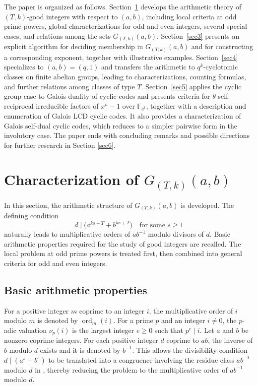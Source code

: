 \documentclass[pdflatex,sn-mathphys-num]{sn-jnl}%
\theoremstyle{thmstyleone}%
\theoremstyle{thmstyletwo}%
\theoremstyle{thmstylethree}%
\newcommand{\F}{\mathbb{F}}
\newcommand{\ord}{\operatorname{ord}}
\begin{document}
   The paper is organized as follows. Section~\ref{sec2} develops the arithmetic theory of $(T,k)$-good integers with respect to $(a,b)$, including local criteria at odd prime powers, global characterizations for odd and even integers, several special cases, and relations among the sets $G_{(T,k)}(a,b)$. Section~\ref{sec3} presents an explicit algorithm for deciding membership in $G_{(T,k)}(a,b)$ and for constructing a corresponding exponent, together with illustrative examples. Section~\ref{sec4}  specializes to $(a,b)=(q,1)$ and transfers the arithmetic to $q^k$-cyclotomic classes on finite abelian groups, leading to characterizations, counting formulas, and further relations among classes of type $T$.  Section~\ref{sec5} applies the cyclic group case to Galois duality of cyclic codes and presents criteria for $\theta$-self-reciprocal irreducible factors of $x^n-1$ over $\F_{q^k}$, together with a description and enumeration of Galois LCD cyclic codes. It also provides a characterization of Galois self-dual  cyclic codes, which reduces to a simpler pairwise form in the involutory case.  The paper ends with concluding remarks and possible directions for further research in Section \ref{sec6}.
 



 


\section{Characterization of $G_{(T,k)}(a,b)$}\label{sec2}
In this section, the arithmetic structure of $G_{(T,k)}(a,b)$ is developed. The defining condition
\[
d\mid \bigl(a^{ks+T}+b^{ks+T}\bigr)
\quad\text{for some } s\ge 1
\]
naturally leads to multiplicative orders of $a b^{-1}$ modulo divisors of $d$. Basic arithmetic properties required for the study of good integers are recalled.   The local problem at odd prime powers is treated first, then combined into general criteria for odd and even integers.

  



\subsection{Basic arithmetic properties}
For a positive integer $m$ coprime to an integer $i$, the multiplicative order of $i$ modulo $m$ is denoted by $\ord_m(i)$. For a prime $p$ and an integer $i\neq 0$, the $p$-adic valuation $\nu_p(i)$ is the largest integer $e\ge 0$ such that $p^e\mid i$. Let $a$ and $b$  be nonzero coprime integers. For each positive integer  $d$ coprime to $ab$, the inverse of $b$ modulo $d$ exists and it is denoted by $ b^{-1}$. This allows the divisibility condition $d\mid (a^s+b^s)$ to be translated into a congruence involving the residue class $a b^{-1}$ modulo $d$ in \cite{Moree1997}, thereby reducing the problem to the multiplicative order of $a b^{-1}$ modulo $d$. 
\end{document}
